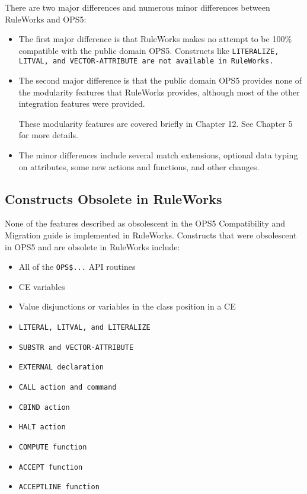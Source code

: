There are two major differences and numerous minor differences between
RuleWorks and OPS5:
\begin{itemize}
\item The first major difference is that RuleWorks makes no attempt to
  be 100\% compatible with the public domain OPS5. Constructs like
  \tt{LITERALIZE}, \tt{LITVAL}, and \tt{VECTOR-ATTRIBUTE} are not
  available in RuleWorks.

\item The second major difference is that the public domain OPS5
  provides none of the modularity features that RuleWorks provides,
  although most of the other integration features were provided.

  These modularity features are covered briefly in Chapter 12. See
  Chapter 5 for more details.

\item The minor differences include several match extensions, optional
  data typing on attributes, some new actions and functions, and other
  changes.
\end{itemize}

\subsection{Constructs Obsolete in RuleWorks}

None of the features described as obsolescent in the OPS5
Compatibility and Migration guide is implemented in
RuleWorks. Constructs that were obsolescent in OPS5 and are obsolete
in RuleWorks include:
\begin{itemize}
\item All of the \verb|OPS$...| API routines

\item CE variables

\item Value disjunctions or variables in the class position in a CE

\item \tt{LITERAL}, \tt{LITVAL}, and \tt{LITERALIZE}

\item \tt{SUBSTR} and \tt{VECTOR-ATTRIBUTE}

\item \tt{EXTERNAL} declaration

\item \tt{CALL} action and command

\item \tt{CBIND} action

\item \tt{HALT} action

\item \tt{COMPUTE} function

\item \tt{ACCEPT} function

\item \tt{ACCEPTLINE} function
\end{itemize}
      
